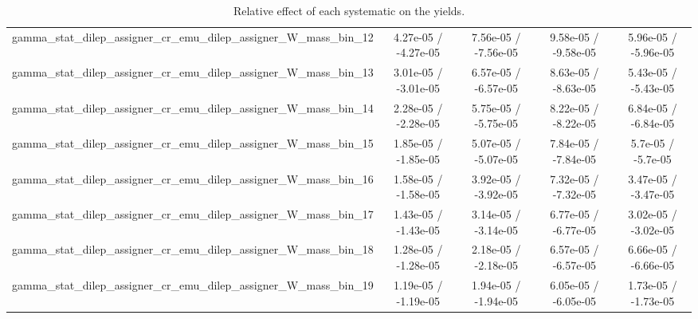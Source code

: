 \documentclass[10pt]{article}
\begin{document}
\begin{table}[htbp]
\begin{center}
\begin{tabular}{|c|c|c|c|c|}
  gamma_stat_dilep_assigner_cr_emu_dilep_assigner_W_mass_bin_12 & 4.27e-05 / -4.27e-05 & 7.56e-05 / -7.56e-05 & 9.58e-05 / -9.58e-05 & 5.96e-05 / -5.96e-05 \\ 
  gamma_stat_dilep_assigner_cr_emu_dilep_assigner_W_mass_bin_13 & 3.01e-05 / -3.01e-05 & 6.57e-05 / -6.57e-05 & 8.63e-05 / -8.63e-05 & 5.43e-05 / -5.43e-05 \\ 
  gamma_stat_dilep_assigner_cr_emu_dilep_assigner_W_mass_bin_14 & 2.28e-05 / -2.28e-05 & 5.75e-05 / -5.75e-05 & 8.22e-05 / -8.22e-05 & 6.84e-05 / -6.84e-05 \\ 
  gamma_stat_dilep_assigner_cr_emu_dilep_assigner_W_mass_bin_15 & 1.85e-05 / -1.85e-05 & 5.07e-05 / -5.07e-05 & 7.84e-05 / -7.84e-05 & 5.7e-05 / -5.7e-05 \\ 
  gamma_stat_dilep_assigner_cr_emu_dilep_assigner_W_mass_bin_16 & 1.58e-05 / -1.58e-05 & 3.92e-05 / -3.92e-05 & 7.32e-05 / -7.32e-05 & 3.47e-05 / -3.47e-05 \\ 
  gamma_stat_dilep_assigner_cr_emu_dilep_assigner_W_mass_bin_17 & 1.43e-05 / -1.43e-05 & 3.14e-05 / -3.14e-05 & 6.77e-05 / -6.77e-05 & 3.02e-05 / -3.02e-05 \\ 
  gamma_stat_dilep_assigner_cr_emu_dilep_assigner_W_mass_bin_18 & 1.28e-05 / -1.28e-05 & 2.18e-05 / -2.18e-05 & 6.57e-05 / -6.57e-05 & 6.66e-05 / -6.66e-05 \\ 
  gamma_stat_dilep_assigner_cr_emu_dilep_assigner_W_mass_bin_19 & 1.19e-05 / -1.19e-05 & 1.94e-05 / -1.94e-05 & 6.05e-05 / -6.05e-05 & 1.73e-05 / -1.73e-05 \\ 
\hline 
\end{tabular} 
\caption{Relative effect of each systematic on the yields.} 
\end{center} 
\end{table} 
\end{document}
